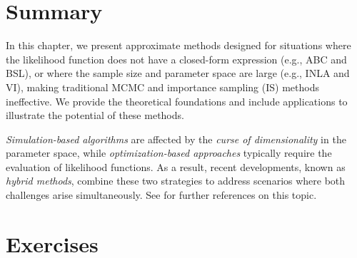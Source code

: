 \section{Summary}\label{sec15_3}
In this chapter, we present approximate methods designed for situations where the likelihood function does not have a closed-form expression (e.g., ABC and BSL), or where the sample size and parameter space are large (e.g., INLA and VI), making traditional MCMC and importance sampling (IS) methods ineffective. We provide the theoretical foundations and include applications to illustrate the potential of these methods.

\textit{Simulation-based algorithms} are affected by the \textit{curse of dimensionality} in the parameter space, while \textit{optimization-based approaches} typically require the evaluation of likelihood functions. As a result, recent developments, known as \textit{hybrid methods}, combine these two strategies to address scenarios where both challenges arise simultaneously. See \cite{martin2024approximating} for further references on this topic.

\section{Exercises}\label{sec15_4}

